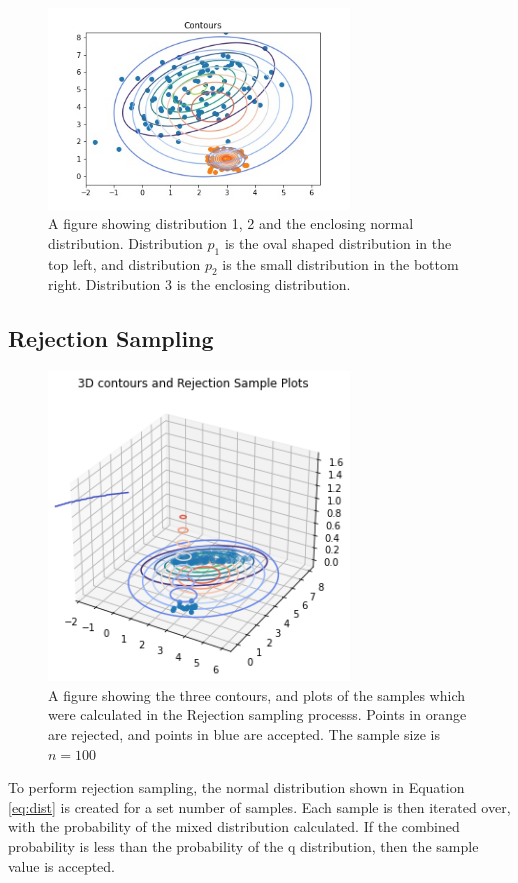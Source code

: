 \documentclass[a4paper, 11pt]{article}
\begin{document}
\begin{figure}[h]
    \begin{center}
    \includegraphics[width=8cm]{fig/distributionsplotted.jpg}
    \caption{A figure showing distribution 1, 2 and the enclosing normal distribution. Distribution $p_1$ is the oval shaped distribution in the top left, and distribution $p_2$ is the small distribution in the bottom right. Distribution 3 is the enclosing distribution.}
    \label{fig:distributions}
\end{center}
\end{figure}

\subsection{Rejection Sampling}

\begin{figure}[h]
    \begin{center}
    \includegraphics[width=8cm]{fig/contour.png}
    \caption{A figure showing the three contours, and plots of the samples which were calculated in the Rejection sampling processs. Points in orange are rejected, and points in blue are accepted. The sample size is $n=100$}
    \label{fig:rejectionsampling}
\end{center}
\end{figure}
To perform rejection sampling, the normal distribution shown in Equation \ref{eq:dist} is created for a set number of samples. Each sample is then iterated over, with the probability of the mixed distribution calculated. If the combined probability is less than the probability of the q distribution, then the sample value is accepted.
\end{document}

